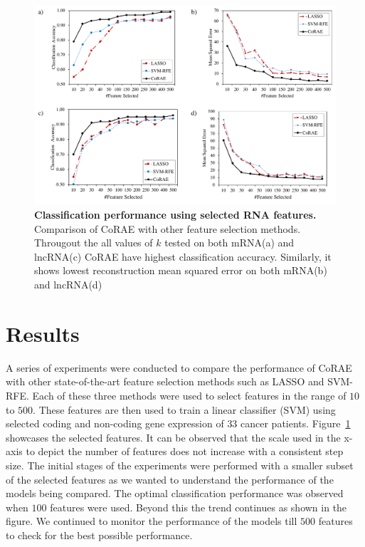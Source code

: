 \documentclass{bioinfo}
\begin{document}
\begin{figure}[hbt]
    \centering
    \includegraphics[scale=0.5]{fig/acc-mse.pdf}
    \caption{\textbf{Classification performance using selected RNA features.}  Comparison of CoRAE with other feature selection methods. Througout the all values of $k$ tested on both mRNA(a) and lncRNA(c) CoRAE have highest classification accuracy. Similarly, it shows lowest reconstruction mean squared error on both mRNA(b) and lncRNA(d)}
    \label{fig:acc-mse}
  \end{figure}
  
\section{Results}
A series of experiments were conducted to compare the performance of CoRAE with other state-of-the-art feature selection methods such as LASSO and SVM-RFE.
Each of these three methods were used to select features in the range of $10$ to $500$.
These features are then used to train a linear classifier (SVM) using selected coding and non-coding gene expression of $33$ cancer patients. 
Figure~\ref{fig:acc-mse} showcases the selected features. It can be observed that the scale used in the x-axis to depict the number of features does not increase with a consistent step size.
The initial stages of the experiments were performed with a smaller subset of the selected features as we wanted to understand the performance of the models being compared.
The optimal classification performance was observed when $100$ features were used.
Beyond this the trend continues as shown in the figure. We continued to monitor the performance of the models till $500$ features to check for the best possible performance. 
\end{document}
